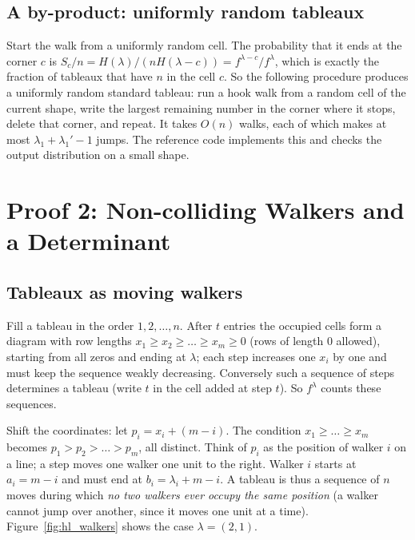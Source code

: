 \documentclass[11pt]{article}
\begin{document}
\subsection{A by-product: uniformly random tableaux}
Start the walk from a uniformly random cell. The probability that it ends at the corner $c$ is $S_c/n=H(\lambda)/(nH(\lambda-c))=f^{\lambda-c}/f^\lambda$, which is exactly the fraction of tableaux that have $n$ in the cell $c$.
So the following procedure produces a uniformly random standard tableau: run a hook walk from a random cell of the current shape, write the largest remaining number in the corner where it stops, delete that corner, and repeat.
It takes $O(n)$ walks, each of which makes at most $\lambda_1+\lambda_1'-1$ jumps. The reference code implements this and checks the output distribution on a small shape.

\section{Proof 2: Non-colliding Walkers and a Determinant}
\subsection{Tableaux as moving walkers}
Fill a tableau in the order $1,2,\dots,n$. After $t$ entries the occupied cells form a diagram with row lengths $x_1\ge x_2\ge\dots\ge x_m\ge0$ (rows of length $0$ allowed), starting from all zeros and ending at $\lambda$;
each step increases one $x_i$ by one and must keep the sequence weakly decreasing. Conversely such a sequence of steps determines a tableau (write $t$ in the cell added at step $t$). So $f^\lambda$ counts these sequences.

Shift the coordinates: let $p_i=x_i+(m-i)$. The condition $x_1\ge\dots\ge x_m$ becomes $p_1>p_2>\dots>p_m$, all distinct. Think of $p_i$ as the position of walker $i$ on a line; a step moves one walker one unit to the right.
Walker $i$ starts at $a_i=m-i$ and must end at $b_i=\lambda_i+m-i$. A tableau is thus a sequence of $n$ moves during which \emph{no two walkers ever occupy the same position}
(a walker cannot jump over another, since it moves one unit at a time). Figure~\ref{fig:hl_walkers} shows the case $\lambda=(2,1)$.
\end{document}
